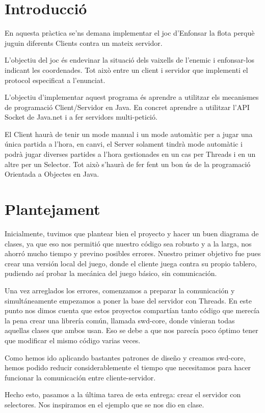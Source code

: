 \section*{Introducció}
En aquesta pràctica se'ns demana implementar el joc d'Enfonsar la flota perquè juguin diferents Clients contra un mateix servidor.

L'objectiu del joc és endevinar la situació dels vaixells de l'enemic i enfonsar-los indicant les coordenades. Tot això entre un client i servidor que implementi el protocol especificat a l'enunciat.

L'objectiu d'implementar aquest programa és aprendre a utilitzar els mecanismes de programació Client/Servidor en Java. En concret aprendre a utilitzar l'API Socket de Java.net i a fer servidors multi-petició.

El Client haurà de tenir un mode manual i un mode automàtic per a jugar una única partida a l'hora, en canvi, el Server solament tindrà mode automàtic i podrà jugar diverses partides a l'hora gestionades en un cas per Threads i en un altre per un Selector.
Tot això s'haurà de fer fent un bon ús de la programació Orientada a Objectes en Java.

\newpage
\section*{Plantejament}
Inicialmente, tuvimos que plantear bien el proyecto y hacer un buen diagrama de clases, ya que eso nos permitió que nuestro código sea robusto  y a la larga, nos ahorró mucho tiempo y previno posibles errores.
Nuestro primer objetivo fue pues crear una versión local del juego, donde el cliente juega contra su propio tablero, pudiendo así probar la mecánica del juego básico, sin comunicación.

Una vez arreglados los errores, comenzamos a preparar la comunicación y simultáneamente empezamos a poner la base del servidor con Threads. En este punto nos dimos cuenta que estos proyectos compartían tanto código que merecía la pena crear una librería común, llamada swd-core,  donde vinieran todas aquellas clases que ambos usan. Eso se debe a que nos parecía poco óptimo tener que modificar el mismo código varias veces.

Como hemos ido aplicando bastantes patrones de diseño y creamos swd-core, hemos podido reducir  considerablemente el tiempo que necesitamos para hacer funcionar la comunicación entre cliente-servidor.

Hecho esto, pasamos a la última tarea de esta entrega: crear el servidor con selectores. Nos inspiramos en el ejemplo que se nos dio en clase.


